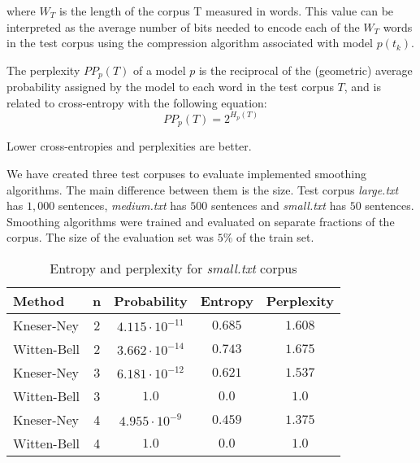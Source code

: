 \documentclass[10pt, a4paper]{article}
\begin{document}
where $W_{T}$ is the length of the corpus T measured in words. This value can be interpreted as the average number of bits needed to encode each of the $W_{T}$ words in the test corpus using the compression algorithm associated with model $p(t_{k})$.

The perplexity $PP_{p}(T)$ of a model $p$ is the reciprocal of the (geometric) average probability assigned by the model to each word in the test corpus $T$, and is related to cross-entropy with the following equation:
\begin{equation}
PP_{p} (T) = 2^{H_{p}(T)}
\end{equation}

Lower cross-entropies and perplexities are better.

We have created three test corpuses to evaluate implemented smoothing algorithms. The main difference between them is the size. Test corpus \textit{large.txt} has $1,000$ sentences, \textit{medium.txt} has $500$ sentences and \textit{small.txt} has $50$ sentences. Smoothing algorithms were trained and evaluated on separate fractions of the corpus. The size of the evaluation set was $5\%$ of the train set. 

\begin{table}[h]
\caption{Entropy and perplexity for \textit{small.txt} corpus}
\label{tab:small}
\begin{center}
\begin{tabular}{lcccc}
\toprule
Method & n & Probability & Entropy & Perplexity \\
\midrule
Kneser-Ney & 2 & $4.115 \cdot 10^{-11}$ & $0.685$ & $1.608$ \\
Witten-Bell & 2 & $3.662 \cdot 10^{-14}$ & $0.743$ & $1.675$ \\

Kneser-Ney & 3 & $6.181 \cdot 10^{-12}$ & $0.621$ & $1.537$ \\
Witten-Bell & 3 & $1.0$ & $0.0$ & $1.0$ \\

Kneser-Ney & 4 & $4.955 \cdot 10^{-9}$ & $0.459$ & $1.375$ \\
Witten-Bell & 4 & $1.0$ & $0.0$ & $1.0$ \\
\bottomrule
\end{tabular}
\end{center}
\end{table}
\end{document}
